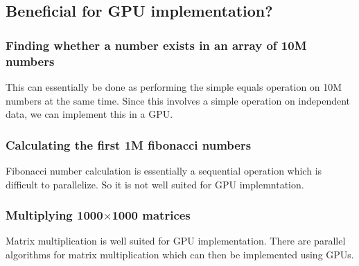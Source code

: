 \documentclass{article}
\begin{document}
\subsection{Beneficial for GPU implementation?}
\subsubsection{Finding whether a number exists in an array of 10M numbers}
This can essentially be done as performing the simple equals operation on 10M numbers at the same time.  Since this involves a simple operation on independent data, we can implement this in a GPU.
\subsubsection{Calculating the first 1M fibonacci numbers}
Fibonacci number calculation is essentially a sequential operation which is difficult to parallelize.  So it is not well suited for GPU implemntation.
\subsubsection{Multiplying 1000$\times$1000 matrices}
Matrix multiplication is well suited for GPU implementation.  There are parallel algorithms for matrix multiplication which can then be implemented using GPUs.



\end{document}

